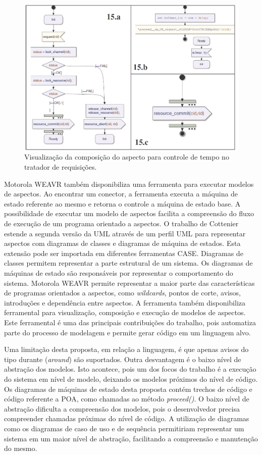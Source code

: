 \begin{figure}
	\centering
	\includegraphics[width=475px]{img/weavr_composed.png}
	\caption{Visualização da composição do aspecto
	para controle de tempo no tratador de requisições.}\label{fig:weavr_composed}
\end{figure}

Motorola WEAVR também disponibiliza uma ferramenta para executar modelos de aspectos. Ao encontrar um conector, a ferramenta executa a máquina de
estado referente ao mesmo e retorna o controle a máquina de estado base. A possibilidade de executar um modelo de aspectos facilita a compreensão do
fluxo de execução de um programa orientado a aspectos. O trabalho de Cottenier estende a segunda versão da UML através de um perfil UML para
representar aspectos com diagramas de classes e diagramas de máquina de estados. Esta extensão pode ser importada em diferentes ferramentas CASE. 
Diagramas de classes permitem representar a parte estrutural de um sistema. Os diagramas de máquinas de estado são responsáveis por representar
o comportamento do sistema. Motorola WEAVR permite representar a maior parte das características de programas orientados a aspectos, como
\textit{wildcards}, pontos de corte, avisos, introduções e dependência entre aspectos. A ferramenta também disponibiliza ferramental para visualização, composição e execução de modelos de aspectos. Este ferramental é uma das principais contribuições do trabalho, pois automatiza parte do processo de modelagem e
permite gerar código em um linguagem alvo.

Uma limitação desta proposta, em relação a linguagem, é que apenas avisos do tipo durante (\textit{around}) são suportados. Outra desvantagem é o baixo nível 
de abstração dos modelos. Isto acontece, pois um dos focos do trabalho é a execução do sistema em nível de modelo, deixando os modelos  próximos do
nível de código. Os diagramas de máquinas de estado desta proposta contém trechos de código e código referente a POA, como chamadas ao método \textit{proceed()}. 
O baixo nível de abstração dificulta a compreensão dos modelos, pois o desenvolvedor precisa compreender chamadas próximas do nível de código. A
utilização de diagramas como os diagramas de caso de uso e de sequência permitiriam representar um sistema em um maior nível de abstração, facilitando a compreensão 
e manutenção do mesmo. 

